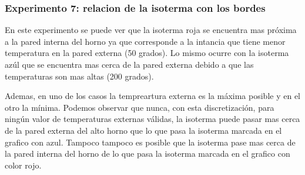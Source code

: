{\subsubsection*{Experimento 7: relacion de la isoterma con los bordes}
 	En este experimento se puede ver que la isoterma roja se encuentra mas próxima a la pared interna del horno ya que corresponde a la intancia que tiene menor temperatura en la pared externa (50 grados). Lo mismo ocurre con la isoterma azúl que se encuentra mas cerca de la pared externa debido a que las temperaturas son mas altas (200 grados).

 	Ademas, en uno de los casos la tempreartura externa es la máxima posible y en el otro la mínima. Podemos observar que nunca, con esta discretización, para ningún valor de temperaturas externas válidas, la isoterma puede pasar mas cerca de la pared externa del alto horno que lo que pasa la isoterma marcada en el grafico con azul. Tampoco tampoco es posible que la isoterma pase mas cerca de la pared interna del horno de lo que pasa la isoterma marcada en el grafico con color rojo.
}
